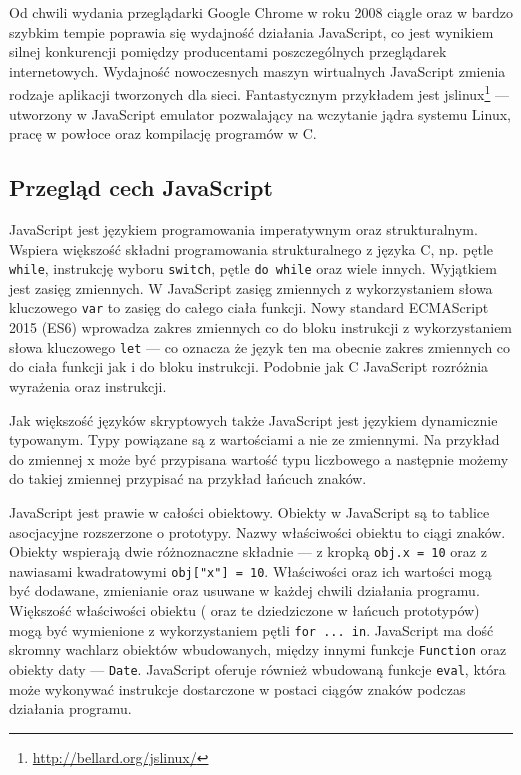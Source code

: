 Od chwili wydania przeglądarki Google Chrome w roku 2008 ciągle oraz w bardzo szybkim tempie poprawia się wydajność działania JavaScript, co jest wynikiem silnej konkurencji pomiędzy producentami poszczególnych przeglądarek internetowych. Wydajność nowoczesnych maszyn wirtualnych JavaScript zmienia rodzaje aplikacji tworzonych dla sieci. Fantastycznym przykładem jest jslinux\footnote{\url{http://bellard.org/jslinux/}} --- utworzony w JavaScript emulator pozwalający na wczytanie jądra systemu Linux, pracę w powłoce oraz kompilację programów w C.

\subsection{Przegląd cech JavaScript}

JavaScript jest językiem programowania imperatywnym oraz strukturalnym. Wspiera większość składni programowania strukturalnego z języka C, np. pętle \verb|while|, instrukcję wyboru \verb|switch|, pętle \verb|do while| oraz wiele innych. Wyjątkiem jest zasięg zmiennych. W JavaScript zasięg zmiennych z wykorzystaniem słowa kluczowego \verb|var| to zasięg do całego ciała funkcji. Nowy standard ECMAScript 2015 (ES6) wprowadza zakres zmiennych co do bloku instrukcji z wykorzystaniem słowa kluczowego \verb|let| --- co oznacza że język ten ma obecnie zakres zmiennych co do ciała funkcji jak i do bloku instrukcji. Podobnie jak C JavaScript rozróżnia wyrażenia oraz instrukcji\cite{jsWiki}. 

Jak większość języków skryptowych także JavaScript jest językiem dynamicznie typowanym. Typy powiązane są z wartościami a nie ze zmiennymi. Na przykład do zmiennej x może być przypisana wartość typu liczbowego a następnie możemy do takiej zmiennej przypisać na przykład łańcuch znaków\cite{jsWiki}. 

JavaScript jest prawie w całości obiektowy. Obiekty w JavaScript są to tablice asocjacyjne rozszerzone o prototypy. Nazwy właściwości obiektu to ciągi znaków. Obiekty wspierają dwie różnoznaczne składnie --- z kropką \verb|obj.x = 10| oraz z nawiasami kwadratowymi \verb|obj["x"] = 10|. Właściwości oraz ich wartości mogą być dodawane, zmienianie oraz usuwane w każdej chwili działania programu. Większość właściwości obiektu ( oraz te dziedziczone w łańcuch prototypów) mogą być wymienione z wykorzystaniem pętli \verb|for ... in|. JavaScript ma dość skromny wachlarz obiektów wbudowanych, między innymi funkcje \verb|Function|  oraz obiekty daty --- \verb|Date|. JavaScript oferuje również wbudowaną funkcje \verb|eval|, która może wykonywać instrukcje dostarczone w postaci ciągów znaków podczas działania programu\cite{jsWiki}. 

